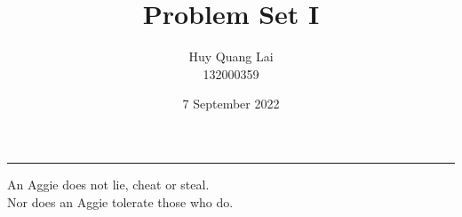 \documentclass[fleqn,12pt]{article}
\title{\vspace{-2.5cm}Problem Set I}
\author{\vspace{-0.2cm} Huy Quang Lai\\132000359}
\affil{Texas A\&M University}
\date{\vspace{-0.5cm}7 September 2022}
\begin{document}
\maketitle
\begin{center}
\rule{\textwidth}{.1pt}
{\large
An Aggie does not lie, cheat or steal.\\
Nor does an Aggie tolerate those who do.
}
\end{center}





\end{document}
